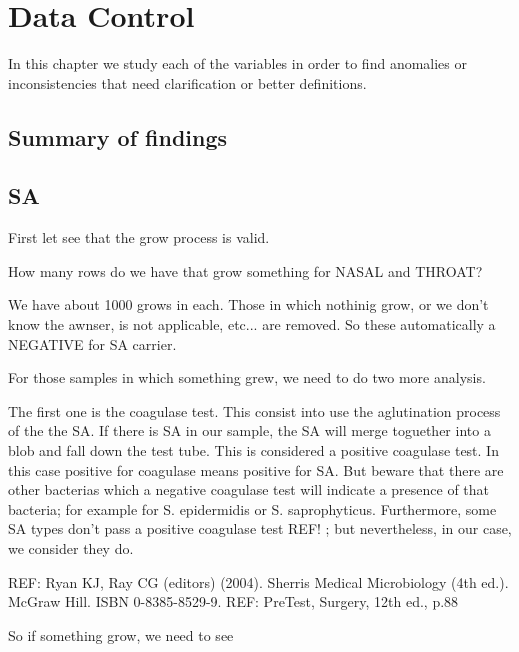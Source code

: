 \chapter{Data Control}\label{ch:control}

In this chapter we study each of the variables in order to find anomalies or inconsistencies that need clarification or better definitions.

\section{Summary of findings}

\section{SA}

First let see that the grow process is valid.\vspace{3 mm}

How many rows do we have that grow something for NASAL and THROAT? \vspace{3 mm}





We have about 1000 grows in each. Those in which nothinig grow, or we don't know the awnser, is not applicable, etc... are removed. So these automatically a NEGATIVE for SA carrier.\vspace{3 mm}

For those samples in which something grew, we need to do two more analysis.\vspace{3 mm}

The first one is the coagulase test. This consist into use the aglutination process of the the SA. If there is SA in our sample, the SA will merge toguether into a blob and fall down the test tube. This is considered a positive coagulase test. In this case positive for coagulase means positive for SA. But beware that there are other bacterias which a negative coagulase test will indicate a presence of that bacteria; for example for S. epidermidis or S. saprophyticus. Furthermore, some SA types don't pass a positive coagulase test REF! ; but nevertheless, in our case, we consider they do. \vspace{3 mm}


REF: Ryan KJ, Ray CG (editors) (2004). Sherris Medical Microbiology (4th ed.). McGraw Hill. ISBN 0-8385-8529-9.
REF: PreTest, Surgery, 12th ed., p.88


 So if something grow, we need to see \vspace{3 mm}